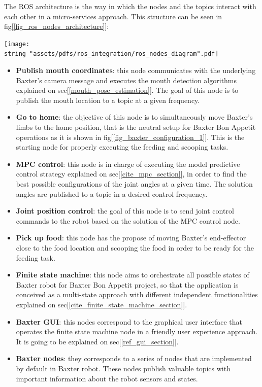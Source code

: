 \documentclass[11pt]{report} %
\begin{document}
The ROS architecture is the way in which the nodes and the topics interact with each other in a micro-services approach. This structure can be seen in fig[\ref{fig_ros_nodes_architecture}]:

\begin{center}
\texttt{[image: \\string "assets/pdfs/ros\_integration/ros\_nodes\_diagram".pdf]}
\bigbreak
\begin{minipage}{\linewidth} %
\label{fig_ros_nodes_architecture}
\end{minipage} \end{center}

\begin{itemize}
    \item \textbf{Publish mouth coordinates}: this node communicates with the underlying Baxter's camera message and executes the mouth detection algorithms explained on sec[\ref{mouth_pose_estimation}]. The goal of this node is to publish the mouth location to a topic at a given frequency.
    \item \textbf{Go to home}: the objective of this node is to simultaneously move Baxter's limbs to the home position, that is the neutral setup for Baxter Bon Appetit operations as it is shown in fig[\ref{fig_baxter_configuration_1}]. This is the starting node for properly executing the feeding and scooping tasks. 
    \item \textbf{MPC control}: this node is in charge of executing the model predictive control strategy explained on sec[\ref{cite_mpc_section}], in order to find the best possible configurations of the joint angles at a given time. The solution angles are published to a topic in a desired control frequency.
    \item \textbf{Joint position control}: the goal of this node is to send joint control commands to the robot based on the solution of the MPC control node.
    \item \textbf{Pick up food}: this node has the propose of moving Baxter's end-effector close to the food location and scooping the food in order to be ready for the feeding task.
    \item \textbf{Finite state machine}: this node aims to orchestrate all possible states of Baxter robot for Baxter Bon Appetit project, so that the application is conceived as a multi-state approach with different independent functionalities explained on sec[\ref{cite_finite_state_machine_section}].
    \item \textbf{Baxter GUI}: this nodes correspond to the graphical user interface that operates the finite state machine node in a friendly user experience approach. It is going to be explained on sec[\ref{ref_gui_section}].
    \item \textbf{Baxter nodes}: they corresponds to a series of nodes that are implemented by default in Baxter robot. These nodes publish valuable topics with important information about the robot sensors and states.
\end{itemize}
\end{document}
